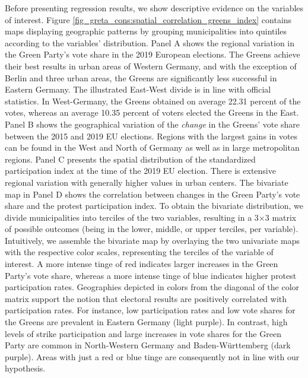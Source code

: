 Before presenting regression results, we show descriptive evidence on the variables of interest. Figure \ref{fig_greta_cons:spatial_correlation_greens_index} contains maps displaying geographic patterns by grouping municipalities into quintiles according to the variables' distribution. Panel A shows the regional variation in the Green Party's vote share in the 2019 European elections. The Greens achieve their best results in urban areas of Western Germany, and with the exception of Berlin and three urban areas, the Greens are significantly less successful in Eastern Germany. The illustrated East-West divide is in line with official statistics. In West-Germany, the Greens obtained on average 22.31 percent of the votes, whereas an average 10.35 percent of voters elected the Greens in the East. Panel B shows the geographical variation of the \textit{change} in the Greens' vote share between the 2015 and 2019 EU elections. Regions with the largest gains in votes can be found in the West and North of Germany as well as in large metropolitan regions. Panel C presents the spatial distribution of the standardized participation index at the time of the 2019 EU election. There is extensive regional variation with generally higher values in urban centers. The bivariate map in Panel D shows the correlation between changes in the Green Party's vote share and the protest participation index. To obtain the bivariate distribution, we divide municipalities into terciles of the two variables, resulting in a 3$\times$3 matrix of possible outcomes (being in the lower, middle, or upper terciles, per variable). Intuitively, we assemble the bivariate map by overlaying the two univariate maps with the respective color scales, representing the terciles of the variable of interest. A more intense tinge of red indicates larger increases in the Green Party's vote share, whereas a more intense tinge of blue indicates higher protest participation rates. Geographies depicted in colors from the diagonal of the color matrix support the notion that electoral results are positively correlated with participation rates. For instance, low participation rates and low vote shares for the Greens are prevalent in Eastern Germany (light purple). In contrast, high levels of strike participation and large increases in vote shares for the Green Party are common in North-Western Germany and Baden-Württemberg (dark purple). Areas with just a red or blue tinge are consequently not in line with our hypothesis.





